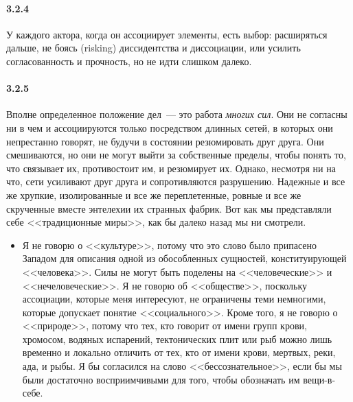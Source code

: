 \paragraph{3.2.4}\hypertarget{par:3.2.4}{} У каждого актора, когда он ассоциирует элементы, есть выбор: расширяться дальше, не боясь (risking) диссидентства и диссоциации, или усилить согласованность и прочность, но не идти слишком далеко. 

\paragraph{3.2.5}\hypertarget{par:3.2.5}{} Вполне определенное положение дел~--- это работа {\itshape многих сил}. Они не согласны ни в чем и ассоциируются только посредством длинных сетей, в которых они непрестанно говорят, не будучи в состоянии резюмировать друг друга. Они смешиваются, но они не могут выйти за собственные пределы, чтобы понять то, что связывает их, противостоит им, и резюмирует их. Однако, несмотря ни на что, сети усиливают друг друга и сопротивляются разрушению. Надежные и все же хрупкие, изолированные и все же переплетенные, ровные и все же скрученные вместе энтелехии их странных фабрик. Вот как мы представляли себе <<традиционные миры>>, как бы далеко назад мы ни смотрели. 
	\begin{itemize}
	\item 
	Я не говорю о <<культуре>>, потому что это слово было припасено Западом для описания одной из обособленных сущностей, конституирующей <<человека>>. Силы не могут быть поделены на <<человеческие>> и <<нечеловеческие>>. Я не говорю об <<обществе>>, поскольку ассоциации, которые меня интересуют, не ограничены теми немногими, которые допускает понятие <<социального>>. Кроме того, я не говорю о <<природе>>, потому что тех, кто говорит от имени групп крови, хромосом, водяных испарений, тектонических плит или рыб можно лишь временно и локально отличить от тех, кто от имени крови, мертвых, реки, ада, и рыбы. Я бы согласился на слово <<бессознательное>>, если бы мы были достаточно восприимчивыми для того, чтобы обозначать им вещи-в-себе.
	\end{itemize}

